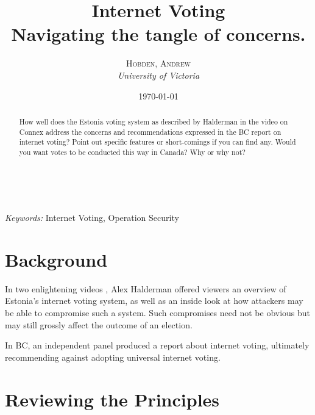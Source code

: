 \documentclass[a4paper, 11pt]{article} %
\title{
    \textbf{Internet Voting}\\ %
    Navigating the tangle of concerns.
} %
\author{\textsc{Hobden, Andrew} %
\\{\textit{University of Victoria}}} %
\date{\today} %
\makeatletter
\renewcommand{\maketitle}{ %
\begin{flushright} %
{\LARGE\@title} %

\vspace{50pt} %

{\large\@author} %
\\\@date %

\vspace{40pt} %
\end{flushright}
}
\makeatother
\begin{document}
\maketitle %



\begin{abstract}
    How well does the Estonia voting system as described by Halderman in the video on Connex address the concerns and recommendations expressed in the BC report on internet voting?  Point out specific features or short-comings if you can find any. Would you want votes to be conducted this way in Canada? Why or why not?
\end{abstract}

\hspace*{3,6mm}\textit{Keywords:} Internet Voting, Operation Security %

\vspace{30pt} %


\section*{Background}

In two enlightening videos \cite{halderman-estonia-presentation} \cite{halderman-estonia-video}, Alex Halderman offered viewers an overview of Estonia's internet voting system, as well as an inside look at how attackers may be able to compromise such a system. Such compromises need not be obvious but may still grossly affect the outcome of an election.

In BC, an independent panel produced a report \cite{internet-voting-report} about internet voting, ultimately recommending against adopting universal internet voting.


\section*{Reviewing the Principles}
\end{document}
